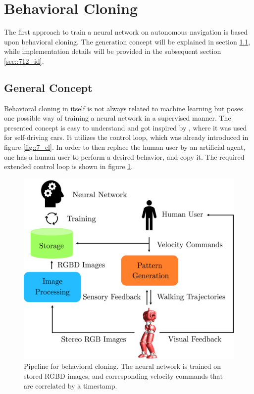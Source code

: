 \FloatBarrier
\section{Behavioral Cloning}
\label{sec::71_bc}
The first approach to train a neural network on autonomous navigation is based upon behavioral cloning. The generation concept will be explained in section \ref{sec::711_gc}, while implementation details will be provided in the subsequent section \ref{sec::712_id}.
\FloatBarrier
\subsection{General Concept}
\label{sec::711_gc}
Behavioral cloning in itself is not always related to machine learning but poses one possible way of training a neural network in a supervised manner. The presented concept is easy to understand and got inspired by \cite{bojarski2016end}, where it was used for self-driving cars. It utilizes the control loop, which was already introduced in figure \ref{fig::7_cl}. In order to then replace the human user by an artificial agent, one has a human user to perform a desired behavior, and copy it. The required extended control loop is shown in figure \ref{fig::71_bc}.
\begin{figure}[h!]
	\centering
	\includegraphics[scale=.5]{chapters/07_autonomous_high_level_control_of_the_walking_pattern_generator/img/behavioral_cloning.png}
	\caption{Pipeline for behavioral cloning. The neural network is trained on stored RGBD images, and corresponding velocity commands that are correlated by a timestamp.}
	\label{fig::71_bc}
\end{figure}
